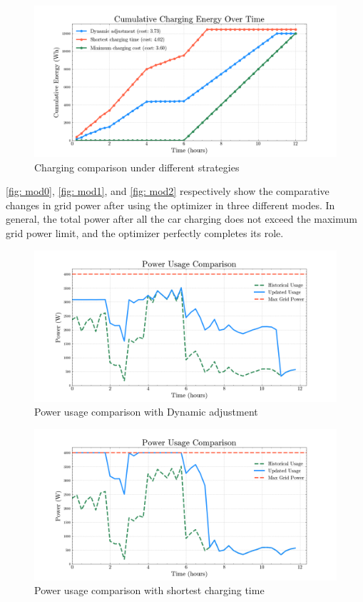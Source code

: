 \documentclass[
	english,
	ruledheaders=section,%
	class=report,%
	thesis={type=Report},%
	accentcolor=9c,%
	custommargins=true,%
	marginpar=false,%
	parskip=half-,%
	fontsize=11pt,%
	logofile={img/tuda_logo.pdf}, %
]{tudapub}
\begin{document}
\begin{figure}
    \centering
    \includegraphics[width=1\linewidth]{img/modcomparison.png}
    \caption{Charging comparison under different strategies}
    \label{fig: modcomparison}
\end{figure}

\autoref{fig: mod0}, \autoref{fig: mod1}, and \autoref{fig: mod2} respectively show the comparative changes in grid power after using the optimizer in three different modes. In general, the total power after all the car charging does not exceed the maximum grid power limit, and the optimizer perfectly completes its role.

\begin{figure}
    \centering
    \includegraphics[width=1\linewidth]{img/mod_0.png}
    \caption{Power usage comparison with Dynamic adjustment}
    \label{fig: mod0}
\end{figure}

\begin{figure}
    \centering
    \includegraphics[width=1\linewidth]{img/mod_1.png}
    \caption{Power usage comparison with shortest charging time}
    \label{fig: mod1}
\end{figure}
\end{document}
